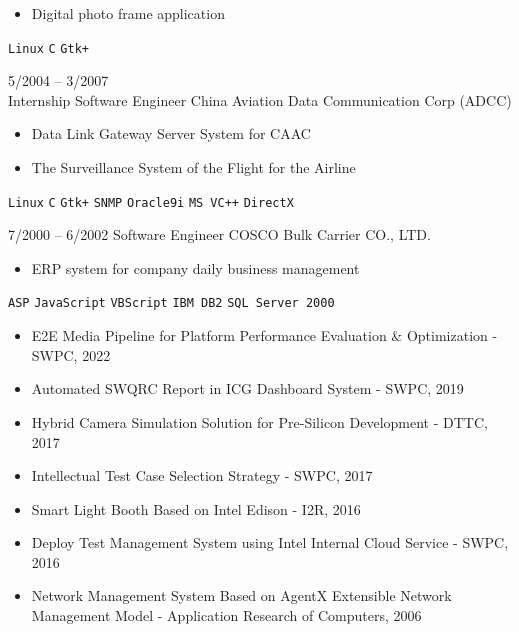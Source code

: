 \documentclass[9pt]{developercv} %
\begin{document}
\begin{entrylist}
{\begin{itemize}[noitemsep,topsep=0pt,parsep=0pt,partopsep=0pt, leftmargin=-1pt]
            \item Digital photo frame application
        \end{itemize} 
        \texttt{Linux} \slashsep \texttt{C} \slashsep \texttt{Gtk+}}
	\entry
		{5/2004 -- 3/2007 \\\footnotesize{Internship}}
		{Software Engineer}
		{China Aviation Data Communication Corp (ADCC)}
		{\vspace{-10pt}
        \begin{itemize}[noitemsep,topsep=0pt,parsep=0pt,partopsep=0pt, leftmargin=-1pt]
            \item Data Link Gateway Server System for CAAC
            \item The Surveillance System of the Flight for the Airline
        \end{itemize}
        \texttt{Linux} \slashsep \texttt{C} \slashsep \texttt{Gtk+} \slashsep \texttt{SNMP} \slashsep \texttt{Oracle9i} \slashsep \texttt{MS VC++} \slashsep \texttt{DirectX}}
	\entry
		{7/2000 -- 6/2002}
		{Software Engineer}
		{COSCO Bulk Carrier CO., LTD.}
		{\vspace{-10pt}
        \begin{itemize}[noitemsep,topsep=0pt,parsep=0pt,partopsep=0pt, leftmargin=-1pt]
            \item ERP system for company daily business management
        \end{itemize}
        \texttt{ASP} \slashsep \texttt{JavaScript} \slashsep \texttt{VBScript} \slashsep \texttt{IBM DB2} \slashsep \texttt{SQL Server 2000}}
\end{entrylist}

\begin{itemize}
\vspace{-10pt}
    \item E2E Media Pipeline for Platform Performance Evaluation \& Optimization - SWPC, 2022
    \item Automated SWQRC Report in ICG Dashboard System - SWPC, 2019
    \item Hybrid Camera Simulation Solution for Pre-Silicon Development - DTTC, 2017
    \item Intellectual Test Case Selection Strategy - SWPC, 2017
    \item Smart Light Booth Based on Intel Edison - I2R, 2016
    \item Deploy Test Management System using Intel Internal Cloud Service - SWPC, 2016
    \item Network Management System Based on AgentX Extensible Network Management Model - Application Research of Computers, 2006
\end{itemize}
\end{document}
